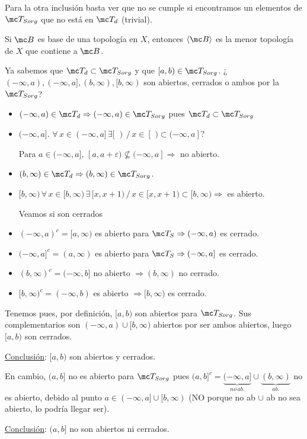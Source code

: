 Para la otra inclusi\'on basta ver que no se cumple si encontramos un elementos de $\mc T_{Sorg}$ que no est\'a en $\mc T_d$ (trivial). 
\begin{ejer}
Si $\mc B$ es base de una topolog\'ia en $X$, entonces $\langle \mc B \rangle$ es la menor topolog\'ia de $X$ que contiene a $\mc B$.
\end{ejer}
\begin{ejer}
Ya sabemos que $\mc T_d\subset \mc T_{Sorg}$ y que $[a,b)\in \mc T_{Sorg}$. ¿$(-\infty,a), (-\infty,a], (b,\infty), [b,\infty)$ son abiertos, cerrados o ambos por la $\mc T_{Sorg}$? 
\begin{itemize}
    \item $(-\infty, a) \in \mc T_d \Rightarrow (-\infty, a) \in \mc T_{Sorg}$ pues $\mc T_d\subset \mc T_{Sorg}$
    \item $(-\infty,a]$. $\forall \, x\in (-\infty,a] \, \exists [\,\,)\, / \, x\in [\,\,) \subset(-\infty,a]?$
    
    Para $a\in (-\infty,a], \, [a,a+\varepsilon) \nsubseteq (-\infty,a]\Rightarrow $ no abierto.
    \item $(b,\infty) \in \mc T_d \Rightarrow (b,\infty)\in \mc T_{Sorg}$.
    \item $[b,\infty)\, \forall \, x\in [b,\infty)\, \exists\,[x,x+1) \, / \, x \in [x,x+1) \subset [b, \infty) \Rightarrow $ es abierto.
    
    Veamos si son cerrados
    \item  $(-\infty,a)^c=[a,\infty)$ es abierto para $\mc T_S \Rightarrow (-\infty,a)$ es cerrado.
    \item $(-\infty,a]^c = (a,\infty)$ es abierto para $\mc T_S \Rightarrow (-\infty,a]$ es cerrado.
    \item $(b,\infty)^c = (-\infty,b]$ no abierto $\Rightarrow (b,\infty)$ no cerrado.
    \item $[b,\infty)^c = (-\infty, b)$ es abierto $\Rightarrow [b,\infty)$ es cerrado.
\end{itemize}
Tenemos pues, por definici\'on, $[a,b)$ son abiertos para $\mc T_{Sorg}$. Sus complementarios son $(-\infty,a) \cup [b,\infty)$ abiertos por ser ambos abiertos, luego $[a,b)$ son cerrados. 

\underline{Conclusi\'on}: $[a,b)$ son abiertos y cerrados.

En cambio, $(a,b]$ no es abierto para $\mc T_{Sorg}$ pues $(a,b]^c = \underbrace{(-\infty,a]}_{no \, ab.}\cup \underbrace{(b,\infty)}_{ab.}$ no es abierto, debido al punto $a\in (-\infty,a]\cup [b,\infty)$ (NO porque no ab $\cup$ ab no sea abierto, lo podr\'ia llegar ser).

\underline{Conclusi\'on}: $(a,b]$ no son abiertos ni cerrados.
\end{ejer}
